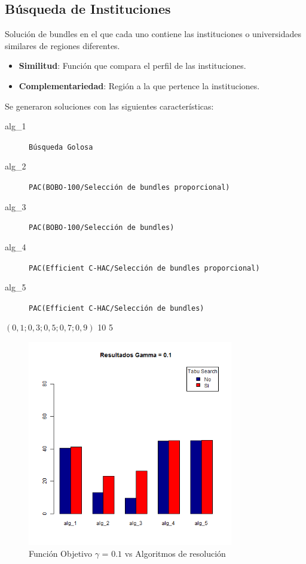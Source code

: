 \subsection{Búsqueda de Instituciones}\label{res:busInstituciones}
Solución de bundles en el que cada uno contiene las instituciones o universidades similares de regiones diferentes.\\
\begin{itemize}
  \item \textbf{Similitud}: Función que compara el perfil de las instituciones.
  \item \textbf{Complementariedad}: Región a la que pertence la instituciones.
\end{itemize}
Se generaron soluciones con las siguientes características:\\
\Solucion
{}
{
\begin{description}
	\item[alg\_1] \texttt{Búsqueda Golosa}
	\item[alg\_2] \texttt{PAC(BOBO-100/Selección de bundles proporcional)}
	\item[alg\_3] \texttt{PAC(BOBO-100/Selección de bundles)}
	\item[alg\_4] \texttt{PAC(Efficient C-HAC/Selección de bundles proporcional)}
	\item[alg\_5] \texttt{PAC(Efficient C-HAC/Selección de bundles)}
\end{description}
}
{$(0,1; 0,3; 0,5; 0,7; 0,9)$}
{10}
{5}

\begin{figure}[H]
  \centering
    \includegraphics[width=0.8\textwidth]{resultados/affiliations/Graficos_agrupados/gamma01-affiliations.png}
  \caption{Función Objetivo $\gamma$ = $0.1$ vs Algoritmos de resolución}
  \label{res:img-affiliations-agr-gamma01}
\end{figure}

